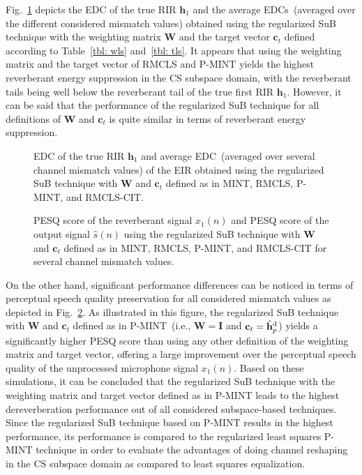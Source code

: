 \documentclass[10pt]{IEEEtran}
\begin{document}
Fig.~\ref{fig: edc} depicts the EDC of the true RIR $\mathbf{h}_1$ and the average EDCs~(averaged over the different considered mismatch values) obtained using the regularized SuB technique with the weighting matrix $\mathbf{W}$ and the target vector $\mathbf{c}_t$ defined according to Table~\ref{tbl: wls} and~\ref{tbl: tls}.
It appears that using the weighting matrix and the target vector of RMCLS and P-MINT yields the highest reverberant energy suppression in the CS subspace domain, with the reverberant tails being well below the reverberant tail of the true first RIR $\mathbf{h}_1$.
However, it can be said that the performance of the regularized SuB technique for all definitions of $\mathbf{W}$ and $\mathbf{c}_t$ is quite similar in terms of reverberant energy suppression.
\begin{figure}[t!]
  \centering
  
  \caption{EDC of the true RIR $\mathbf{h}_1$ and average EDC~(averaged over several channel mismatch values) of the EIR obtained using the regularized SuB technique with $\mathbf{W}$ and $\mathbf{c}_t$ defined as in MINT, RMCLS, P-MINT, and RMCLS-CIT.}
  \label{fig: edc}
\end{figure}
\begin{figure}[t!]
  \centering
  
\caption{PESQ score of the reverberant signal $x_1(n)$ and PESQ score of the output signal $\hat{s}(n)$ using the regularized SuB technique with $\mathbf{W}$ and $\mathbf{c}_t$ defined as in MINT, RMCLS, P-MINT, and RMCLS-CIT for several channel mismatch values.}
\label{fig: pesq}
\end{figure}
On the other hand, significant performance differences can be noticed in terms of perceptual speech quality preservation for all considered mismatch values as depicted in Fig.~\ref{fig: pesq}.
As illustrated in this figure, the regularized SuB technique with $\mathbf{W}$ and $\mathbf{c}_t$ defined as in P-MINT~(i.e., $\mathbf{W} = \mathbf{I}$ and $\mathbf{c}_t = \hat{\mathbf{h}}_p^{\rm d}$) yields a significantly higher PESQ score than using any other definition of the weighting matrix and target vector, offering a large improvement over the perceptual speech quality of the unprocessed microphone signal $x_1(n)$.
Based on these simulations, it can be concluded that the regularized SuB technique with the weighting matrix and target vector defined as in P-MINT leads to the highest dereverberation performance out of all considered subspace-based techniques.
Since the regularized SuB technique based on P-MINT results in the highest performance, its performance is compared to the regularized least squares P-MINT technique in order to evaluate the advantages of doing channel reshaping in the CS subspace domain as compared to least squares equalization.
\end{document}
